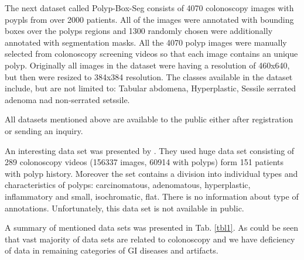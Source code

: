 \documentclass[preprint]{article}
\renewcommand{\onecolumn}{}
\newcommand{\tabletextsize}{\tiny}
\begin{document}
The next dataset called Polyp-Box-Seg\cite{Polyp-Box-Seg} consists of 4070 colonoscopy images with poypls from over 2000 patients. All of the images were annotated with bounding boxes over the polyps regions and 1300 randomly chosen were additionally annotated with segmentation masks. All the 4070 polyp images were manually selected from colonoscopy screening videos so that each image contains an unique polyp. Originally all images in the dataset were having a resolution of 460x640, but then were resized to 384x384 resolution. The classes available in the dataset include, but are not limited to: Tabular abdomena, Hyperplastic, Sessile serrated adenoma nad non-serrated setssile.

All datasets mentioned above are available to the public either after registration or sending an inquiry.

An interesting data set was presented by \cite{wang2017}. They used huge data set consisting of 289 colonoscopy videos (156337 images, 60914 with polyps) form 151 patients with polyp history. Moreover the set contains a division into individual types and characteristics of polyps: carcinomatous, adenomatous, hyperplastic, inflammatory and small, isochromatic, flat. There is no information about type of annotations. Unfortunately, this data set is not available in public.

A summary of mentioned data sets was presented in Tab. \ref{tbl1}. As could be seen that vast majority of data sets are related to colonoscopy and we have deficiency of data in remaining categories of GI diseases and artifacts. 

\newcommand{\longcell}{\pretolerance=10 \tolerance=5 \emergencystretch=0pt }



\onecolumn

\tabletextsize
\setlength\tabcolsep{2pt}
\end{document}
